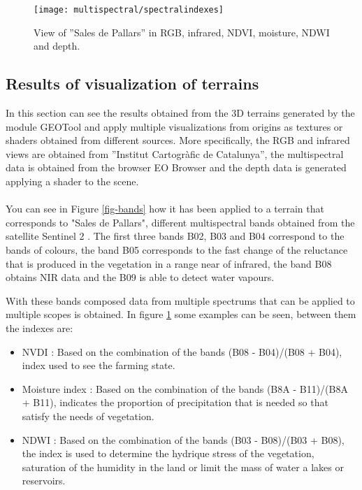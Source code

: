 \documentclass[10pt,a4paper,twocolumn,twoside]{article}
\begin{document}
\begin{figure}[!h]
\centering
  	\texttt{[image: multispectral/spectralindexes]}
	\caption{View of ''Sales de Pallars'' in RGB, infrared, NDVI, moisture, NDWI and depth.}
	\label{fig-spectralindexes}
\end{figure}

\subsection{Results of visualization of terrains}
In this section can see the results obtained from the 3D terrains generated by the module GEOTool and apply multiple visualizations from origins as textures or shaders obtained from different sources. More specifically, the RGB and infrared views are obtained from ''Institut Cartogràfic de Catalunya'', the multispectral data is obtained from the browser EO Browser \cite{eobrowser} and the depth data is generated applying a shader to the scene.
\\
\\
You can see in Figure \ref{fig-bands} how it has been applied to a terrain that corresponds to "Sales de Pallars", different multispectral bands obtained from the satellite Sentinel 2 \cite{sentinel2}. The first three bands B02, B03 and B04 correspond to the bands of colours, the band B05 corresponds to the fast change of the reluctance that is produced in the vegetation in a range near of infrared, the band B08 obtains NIR \cite{nir} data and the B09 is able to detect water vapours.

With these bands composed data from multiple spectrums that can be applied to multiple scopes is obtained. In figure \ref{fig-spectralindexes} some examples can be seen, between them the indexes are:

\begin{itemize}
\setlength\itemsep{0em}
\item 
{
	NVDI \cite{ndvi}: Based on the combination of the bands (B08 - B04)/(B08 + B04), index used to see the farming state.
}
\item
{
	Moisture index \cite{moisture}: Based on the combination of the bands (B8A - B11)/(B8A + B11), indicates the proportion of precipitation that is needed so that satisfy the needs of vegetation.
}
\item
{
	NDWI \cite{ndwi}: Based on the combination of the bands (B03 - B08)/(B03 + B08), the index is used to determine the hydrique stress of the vegetation, saturation of the humidity in the land or limit the mass of water a lakes or reservoirs.
}
\end{itemize} 
\end{document}
